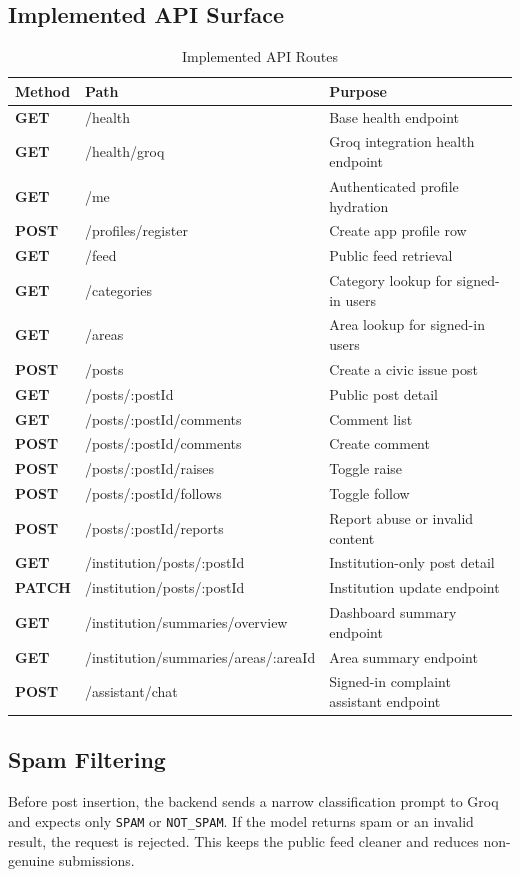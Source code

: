 \documentclass[12pt,a4paper]{report}
\begin{document}
\subsection{Implemented API Surface}
\begin{table}[H]
\centering
\caption{Implemented API Routes}
\begin{tabularx}{\textwidth}{>{\bfseries}l>{\ttfamily}lX}
\toprule
Method & Path & Purpose \\
\midrule
GET & /health & Base health endpoint \\
GET & /health/groq & Groq integration health endpoint \\
GET & /me & Authenticated profile hydration \\
POST & /profiles/register & Create app profile row \\
GET & /feed & Public feed retrieval \\
GET & /categories & Category lookup for signed-in users \\
GET & /areas & Area lookup for signed-in users \\
POST & /posts & Create a civic issue post \\
GET & /posts/:postId & Public post detail \\
GET & /posts/:postId/comments & Comment list \\
POST & /posts/:postId/comments & Create comment \\
POST & /posts/:postId/raises & Toggle raise \\
POST & /posts/:postId/follows & Toggle follow \\
POST & /posts/:postId/reports & Report abuse or invalid content \\
GET & /institution/posts/:postId & Institution-only post detail \\
PATCH & /institution/posts/:postId & Institution update endpoint \\
GET & /institution/summaries/overview & Dashboard summary endpoint \\
GET & /institution/summaries/areas/:areaId & Area summary endpoint \\
POST & /assistant/chat & Signed-in complaint assistant endpoint \\
\bottomrule
\end{tabularx}
\end{table}

\subsection{Spam Filtering}
Before post insertion, the backend sends a narrow classification prompt to Groq and expects only \texttt{SPAM} or \texttt{NOT\_SPAM}. If the model returns spam or an invalid result, the request is rejected. This keeps the public feed cleaner and reduces non-genuine submissions.
\end{document}

